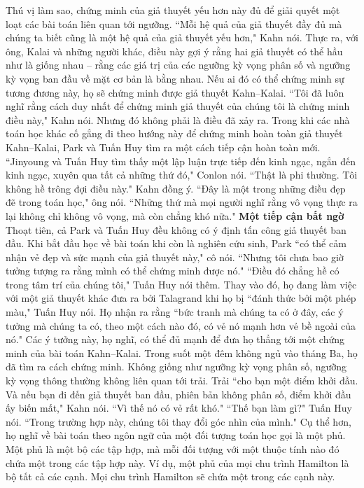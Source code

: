 \begin{multicols}{2}
	\vskip 0.1cm
	Thú vị làm sao, chứng minh của giả thuyết yếu hơn này đủ để giải quyết một loạt các bài toán liên quan tới ngưỡng. ``Mỗi hệ quả của giả thuyết đầy đủ mà chúng ta biết cũng là một hệ quả của giả thuyết yếu hơn," Kahn nói. Thực ra, với ông, Kalai và những người khác, điều này gợi ý rằng hai giả thuyết có thể hầu như là giống nhau -- rằng các giá trị của các ngưỡng kỳ vọng phân số và ngưỡng kỳ vọng ban đầu về mặt cơ bản là bằng nhau. Nếu ai đó có thể chứng minh sự tương đương  này, họ sẽ chứng minh được giả thuyết Kahn--Kalai. ``Tôi đã luôn nghĩ rằng cách duy nhất để chứng minh giả thuyết của chúng tôi là chứng minh điều này," Kahn nói.
	\vskip 0.1cm
	Nhưng đó không phải là điều đã xảy ra. Trong khi các nhà toán học khác cố gắng đi theo hướng này để chứng minh hoàn toàn giả thuyết Kahn--Kalai, Park và Tuấn Huy tìm ra một cách tiếp cận hoàn toàn mới. ``Jinyoung và Tuấn Huy tìm thấy một lập luận trực tiếp đến kinh ngạc, ngắn đến kinh ngạc, xuyên qua tất cả những thứ đó," Conlon nói. ``Thật là phi thường. Tôi không hề trông đợi điều này."
	\vskip 0.1cm
	Kahn đồng ý. ``Đây là một trong những điều đẹp đẽ trong toán học," ông nói.
	``Những thứ mà mọi người nghĩ rằng vô vọng thực ra lại không chỉ không vô vọng, mà còn chẳng khó nữa."
	\vskip 0.1cm
	\textbf{\color{duongvaotoanhoc}Một tiếp cận bất ngờ}
	\vskip 0.1cm
	Thoạt tiên, cả Park và Tuấn Huy đều không có ý định tấn công giả thuyết ban đầu. Khi bắt đầu học về bài toán khi còn là nghiên cứu sinh, Park ``có thể cảm nhận vẻ đẹp và sức mạnh của giả thuyết này," cô nói. ``Nhưng tôi chưa bao giờ tưởng tượng ra rằng mình có thể chứng minh được nó."
	\vskip 0.1cm
	``Điều đó chẳng hề có trong tâm trí của chúng tôi," Tuấn Huy nói thêm.
	\vskip 0.1cm
	Thay vào đó, họ đang làm việc với một giả thuyết khác đưa ra bởi Talagrand khi họ bị ``đánh thức bởi một phép màu," Tuấn Huy nói. Họ nhận ra rằng ``bức tranh mà chúng ta có ở đây, các ý tưởng mà chúng ta có,  theo một cách nào đó, có vẻ nó mạnh hơn vẻ bề ngoài của nó." Các ý tưởng này, họ nghĩ, có thể đủ mạnh để đưa họ thẳng tới một chứng minh của bài toán Kahn--Kalai.
	\vskip 0.1cm
	Trong suốt một đêm không ngủ vào tháng Ba, họ đã tìm ra cách chứng minh.
	\vskip 0.1cm
	Không giống như ngưỡng kỳ vọng phân số, ngưỡng kỳ vọng thông thường không liên quan tới trải. Trải ``cho bạn một điểm khởi đầu. Và nếu bạn đi đến giả thuyết ban đầu, phiên bản không phân số, điểm khởi đầu ấy biến mất," Kahn nói. ``Vì thế nó có vẻ rất khó."
	\vskip 0.1cm
	``Thế bạn làm gì?" Tuấn Huy nói. ``Trong trường hợp này, chúng tôi thay đổi góc nhìn của mình."
	\vskip 0.1cm
	Cụ thể hơn, họ nghĩ về bài toán  theo ngôn ngữ của  một đối tượng toán học gọi là một phủ. Một phủ là một bộ các tập hợp, mà mỗi đối tượng với một thuộc tính nào đó chứa một trong các tập hợp này. Ví dụ, một phủ của mọi chu trình Hamilton là bộ tất cả các cạnh. Mọi chu trình Hamilton sẽ chứa một trong các cạnh này.

\end{multicols}
